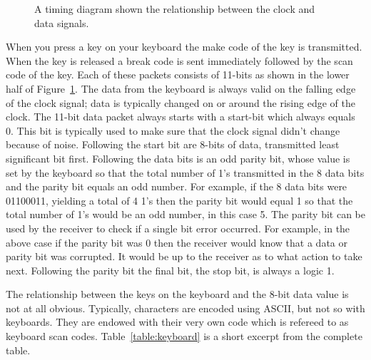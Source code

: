 \begin{figure}[ht]
\caption{A timing diagram shown the relationship between the
clock and data signals.}
\label{fig:commonPeripheralComponentskeyboard}
\end{figure}

When you press a key on your keyboard the make code of the key is 
transmitted.  When the key is released a break code is sent immediately 
followed by the scan code of the key.  Each of these packets consists
of 11-bits as shown in the lower half of Figure~\ref{fig:commonPeripheralComponentskeyboard}.
The data from the keyboard is always valid on the falling edge of the
clock signal; data is typically changed on or around the rising edge
of the clock.  The 11-bit data packet always starts with a start-bit
which always equals 0.  This bit is typically used to make sure that 
the clock signal didn't change because of noise.  Following the
start bit are 8-bits of data, transmitted least significant bit first.
Following the data bits is an odd parity bit, whose value is set by the 
keyboard so that the total number of 1's transmitted in the 8 data
bits and the parity bit equals an odd number.  For example, if the
8 data bits were 01100011, yielding a total of 4 1's then the parity
bit would equal 1 so that the total number of 1's would be an odd
number, in this case 5.  The parity bit can be used by the receiver
to check if a single bit error occurred.  For example, in the above 
case if the parity bit was 0 then the receiver would know that a data
or parity bit was corrupted.  It would be up to the receiver as
to what action to take next.  Following the parity bit the final
bit, the stop bit, is always a logic 1.

The relationship between the keys on the keyboard and the 8-bit data
value is not at all obvious.  Typically, characters are encoded using
ASCII, but not so with keyboards.  They are endowed with their very
own code which is refereed to as keyboard scan codes.  
Table~\ref{table:keyboard} is a short excerpt from the complete table.


